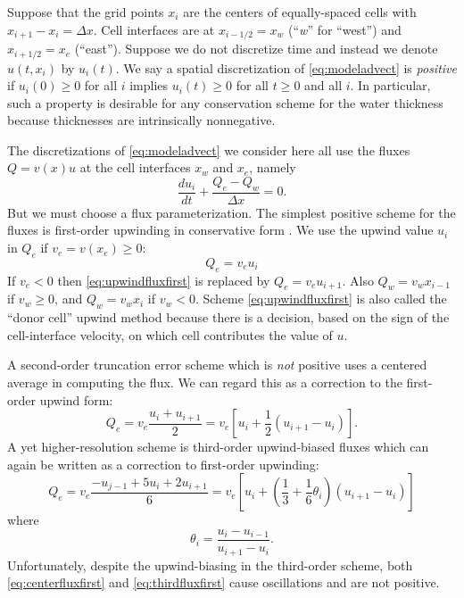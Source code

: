 \documentclass[11pt,final]{amsart}
\begin{document}
Suppose that the grid points $x_i$ are the centers of equally-spaced cells with $x_{i+1}-x_i=\Delta x$.  Cell interfaces are at $x_{i-1/2}=x_w$ (``\emph{w}'' for ``west'') and $x_{i+1/2}=x_e$ (``east'').  Suppose we do not discretize time and instead we denote $u(t,x_i)$ by $u_i(t)$.  We say a spatial discretization of \eqref{eq:modeladvect} is \emph{positive} if $u_i(0) \ge 0$ for all $i$ implies $u_i(t)\ge 0$ for all $t\ge 0$ and all $i$.  In particular, such a property is desirable for any conservation scheme for the water thickness because thicknesses are intrinsically nonnegative.

The discretizations of \eqref{eq:modeladvect} we consider here all use the fluxes $Q=v(x) u$ at the cell interfaces $x_w$ and $x_e$, namely
\begin{equation}
\frac{du_i}{dt} + \frac{Q_e - Q_w}{\Delta x} = 0. \label{eq:basicmodelFD}
\end{equation}
But we must choose a flux parameterization.  The simplest positive scheme for the fluxes is first-order upwinding in conservative form \citep[section I.4.3]{HundsdorferVerwer2010}.  We use the upwind value $u_i$ in $Q_e$ if $v_e = v(x_e) \ge 0$:
\begin{equation}
Q_e = v_e u_i \label{eq:upwindfluxfirst}
\end{equation}
If $v_e < 0$ then \eqref{eq:upwindfluxfirst} is replaced by $Q_e = v_e u_{i+1}$. 
Also $Q_w = v_w x_{i-1}$ if $v_w \ge 0$, and $Q_w = v_w x_{i}$ if $v_w < 0$.  Scheme \eqref{eq:upwindfluxfirst} is also called the ``donor cell'' upwind method \citep{LeVeque} because there is a decision, based on the sign of the cell-interface velocity, on which cell contributes the value of $u$.

A second-order truncation error scheme which is \emph{not} positive uses a centered average in computing the flux.  We can regard this as a correction to the first-order upwind form:
\begin{equation}
Q_e = v_e \frac{u_i+u_{i+1}}{2} = v_e \left[u_i + \frac{1}{2} (u_{i+1} - u_i)\right]. \label{eq:centerfluxfirst}
\end{equation}
A yet higher-resolution scheme is third-order upwind-biased fluxes which can again be written as a correction to first-order upwinding:
\begin{equation}
Q_e = v_e \frac{-u_{j-1} + 5 u_i + 2 u_{i+1}}{6} = v_e \left[u_i + \left(\frac{1}{3}+\frac{1}{6} \theta_i \right) (u_{i+1} - u_i)\right] \label{eq:thirdfluxfirst}
\end{equation}
where
\begin{equation}
\theta_i = \frac{u_{i} - u_{i-1}}{u_{i+1} - u_i}.  \label{eq:thetadefine}
\end{equation}
Unfortunately, despite the upwind-biasing in the third-order scheme, both \eqref{eq:centerfluxfirst} and \eqref{eq:thirdfluxfirst} cause oscillations and are not positive.
\end{document}
